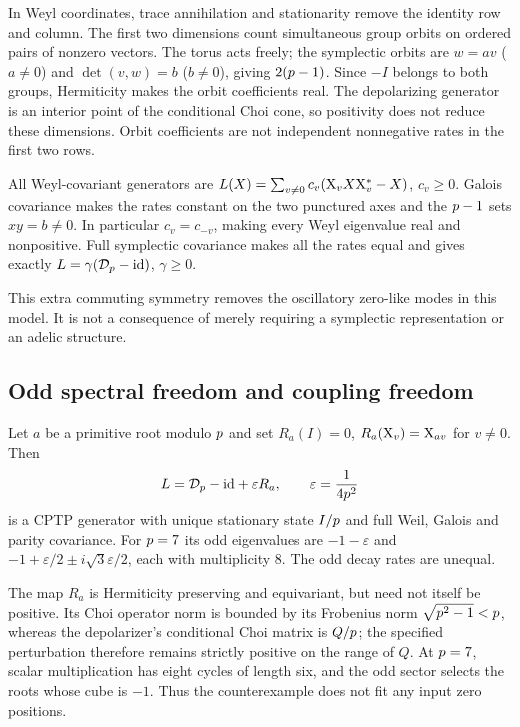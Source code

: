 In Weyl coordinates, trace annihilation and stationarity remove the
identity row and column. The first two dimensions count simultaneous
group orbits on ordered pairs of nonzero vectors. The torus acts freely;
the symplectic orbits are $w=av$ ($a\ne0$) and
$\det(v,w)=b$ ($b\ne0$), giving $2(p-1)$. Since $-I$ belongs to both
groups, Hermiticity makes the orbit coefficients real. The depolarizing
generator is an interior point of the conditional Choi cone, so positivity
does not reduce these dimensions. Orbit coefficients are not independent
nonnegative rates in the first two rows.

\begin{proposition}
\label{prop:bc-weyl-covariance-collapse}
All Weyl-covariant generators are
$L(X)=\sum_{v\ne0}c_v(\mathrm{X}_{v}X\mathrm{X}_{v}^*-X)$, $c_v\ge0$.
Galois covariance makes the rates constant on the two punctured axes and
the $p-1$ sets $xy=b\ne0$. In particular $c_v=c_{-v}$, making every
Weyl eigenvalue real and nonpositive. Full symplectic covariance makes
all the rates equal and gives exactly
$L=\gamma(\mathcal D_{p}-\mathrm{id})$, $\gamma\ge0$.
\end{proposition}

This extra commuting symmetry removes the oscillatory zero-like modes in
this model. It is not a consequence of merely requiring a symplectic
representation or an adelic structure.

\subsection{Odd spectral freedom and coupling freedom}

\begin{proposition}
\label{prop:bc-symplectic-odd-counterexample}
Let $a$ be a primitive root modulo $p$ and set $R_a(I)=0$,
$R_a(\mathrm{X}_{v})=\mathrm{X}_{av}$ for $v\ne0$. Then
\[
 L=\mathcal D_{p}-\mathrm{id}+\varepsilon R_a,
 \qquad\varepsilon=\frac1{4p^2}
\]
is a CPTP generator with unique stationary state $I/p$ and full
Weil, Galois and parity covariance. For $p=7$ its odd eigenvalues are
$-1-\varepsilon$ and $-1+\varepsilon/2\pm i\sqrt3\varepsilon/2$, each
with multiplicity $8$. The odd decay rates are unequal.
\end{proposition}

The map $R_a$ is Hermiticity preserving and equivariant, but need not itself
be positive. Its Choi operator norm is bounded by its Frobenius norm
$\sqrt{p^2-1}<p$, whereas the depolarizer's conditional Choi matrix
is $Q/p$; the specified perturbation therefore remains strictly positive
on the range of $Q$. At $p=7$, scalar multiplication has eight cycles of
length six, and the odd sector selects the roots whose cube is $-1$.
Thus the counterexample does not fit any input zero positions.

